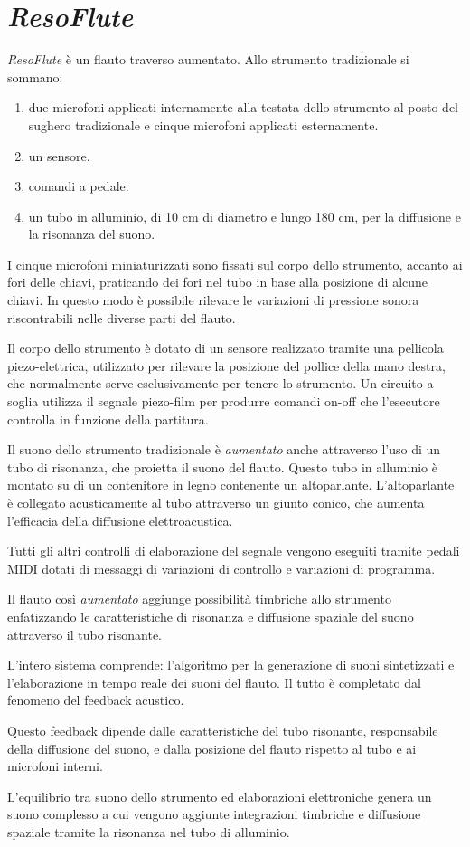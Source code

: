 \section{\emph{ResoFlute}}

\emph{ResoFlute} è un flauto traverso aumentato. Allo strumento tradizionale si sommano:

\begin{enumerate}
  \item due microfoni applicati internamente alla testata dello strumento al posto del
sughero tradizionale e cinque microfoni applicati esternamente.
  \item un sensore.
  \item comandi a pedale.
  \item un tubo in alluminio, di 10 cm di diametro e lungo 180 cm, per la diffusione e
la risonanza del suono.
\end{enumerate}

I cinque microfoni miniaturizzati sono fissati sul corpo dello strumento, accanto
ai fori delle chiavi, praticando dei fori nel tubo in base alla posizione di alcune chiavi. In questo modo è possibile rilevare le variazioni di pressione sonora riscontrabili nelle diverse parti del flauto.

Il corpo dello strumento è dotato di un sensore realizzato tramite una pellicola
piezo-elettrica, utilizzato per rilevare la posizione del pollice della mano
destra, che normalmente serve esclusivamente per tenere lo strumento. Un circuito
a soglia utilizza il segnale piezo-film  per produrre comandi on-off che
l'esecutore controlla in funzione della partitura.

Il suono dello strumento tradizionale è \emph{aumentato} anche attraverso l'uso
di un tubo di risonanza, che proietta il suono del flauto. Questo tubo in
alluminio è montato su di un contenitore in legno contenente un altoparlante.
L'altoparlante è collegato acusticamente al tubo attraverso un giunto conico, che aumenta l’efficacia della diffusione elettroacustica.

Tutti gli altri controlli di elaborazione del segnale vengono eseguiti tramite
pedali MIDI dotati di messaggi di variazioni di controllo e variazioni di programma.

Il flauto così \emph{aumentato} aggiunge possibilità timbriche allo strumento enfatizzando le caratteristiche di risonanza e diffusione spaziale del suono
attraverso il tubo risonante.

L'intero sistema comprende: l'algoritmo per la generazione di suoni sintetizzati
e l’elaborazione in tempo reale dei suoni del flauto. Il tutto è completato dal
fenomeno del feedback acustico.

Questo feedback dipende dalle caratteristiche del tubo risonante, responsabile
della diffusione del suono, e dalla posizione del flauto rispetto al tubo e ai microfoni interni.

L’equilibrio tra suono dello strumento ed elaborazioni elettroniche genera un
suono complesso a cui  vengono aggiunte integrazioni timbriche e diffusione
spaziale tramite la risonanza nel tubo di alluminio.
